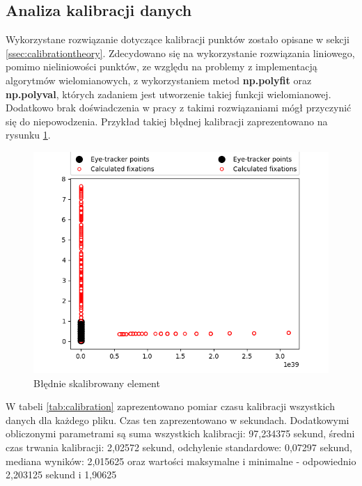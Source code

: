 \subsection{Analiza kalibracji danych}
\label{ssec:calibration}
Wykorzystane rozwiązanie dotyczące kalibracji punktów zostało opisane w sekcji \ref{ssec:calibrationtheory}. Zdecydowano się na wykorzystanie rozwiązania liniowego, pomimo nieliniowości punktów, ze względu na problemy z implementacją algorytmów wielomianowych, z wykorzystaniem metod \textbf{np.polyfit} oraz \textbf{np.polyval}, których zadaniem jest utworzenie takiej funkcji wielomianowej. Dodatkowo brak doświadczenia w pracy z takimi rozwiązaniami mógł przyczynić się do niepowodzenia. Przykład takiej błędnej kalibracji zaprezentowano na rysunku \ref{fig:error_cal}.
\begin{figure}[H]
    \centering
    \captionsetup{justification=centering,margin=2cm}
    \includegraphics[width=\linewidth]{resources/error_cal.png}
    \caption{Błędnie skalibrowany element}
    \label{fig:error_cal}
\end{figure}
W tabeli \ref{tab:calibration} zaprezentowano pomiar czasu kalibracji wszystkich danych dla każdego pliku. Czas ten zaprezentowano w sekundach. Dodatkowymi obliczonymi parametrami są suma wszystkich kalibracji: 97,234375 sekund, średni czas trwania kalibracji:	2,02572 sekund, odchylenie standardowe: 0,07297 sekund, mediana wyników: 2,015625 oraz wartości maksymalne i minimalne - odpowiednio 2,203125 sekund i 1,90625
